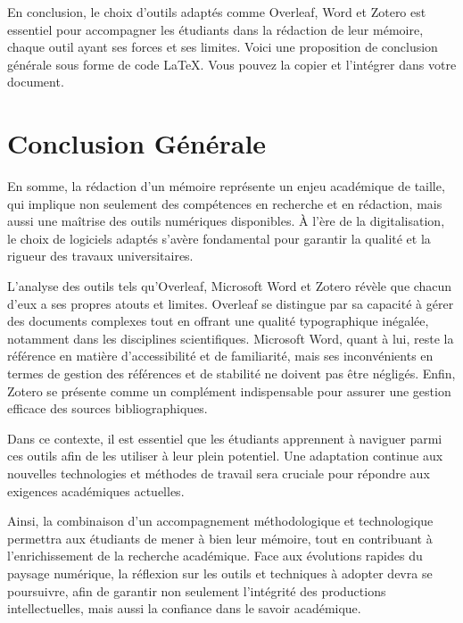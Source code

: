 \documentclass[12pt,a4paper]{article}
\begin{document}
En conclusion, le choix d'outils adaptés comme Overleaf, Word et Zotero est essentiel pour accompagner les étudiants dans la rédaction de leur mémoire, chaque outil ayant ses forces et ses limites.
Voici une proposition de conclusion générale sous forme de code LaTeX. Vous pouvez la copier et l’intégrer dans votre document.

\section{Conclusion Générale}

En somme, la rédaction d'un mémoire représente un enjeu académique de taille, qui implique non seulement des compétences en recherche et en rédaction, mais aussi une maîtrise des outils numériques disponibles. À l'ère de la digitalisation, le choix de logiciels adaptés s'avère fondamental pour garantir la qualité et la rigueur des travaux universitaires.

L'analyse des outils tels qu'Overleaf, Microsoft Word et Zotero révèle que chacun d'eux a ses propres atouts et limites. Overleaf se distingue par sa capacité à gérer des documents complexes tout en offrant une qualité typographique inégalée, notamment dans les disciplines scientifiques. Microsoft Word, quant à lui, reste la référence en matière d'accessibilité et de familiarité, mais ses inconvénients en termes de gestion des références et de stabilité ne doivent pas être négligés. Enfin, Zotero se présente comme un complément indispensable pour assurer une gestion efficace des sources bibliographiques.

Dans ce contexte, il est essentiel que les étudiants apprennent à naviguer parmi ces outils afin de les utiliser à leur plein potentiel. Une adaptation continue aux nouvelles technologies et méthodes de travail sera cruciale pour répondre aux exigences académiques actuelles.

Ainsi, la combinaison d'un accompagnement méthodologique et technologique permettra aux étudiants de mener à bien leur mémoire, tout en contribuant à l'enrichissement de la recherche académique. Face aux évolutions rapides du paysage numérique, la réflexion sur les outils et techniques à adopter devra se poursuivre, afin de garantir non seulement l'intégrité des productions intellectuelles, mais aussi la confiance dans le savoir académique.
\end{document}

